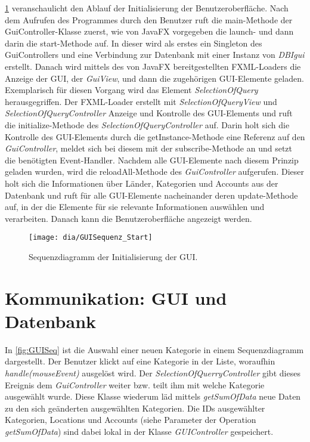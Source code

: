 \cref{fig:GUIStartSeq} veranschaulicht den Ablauf der Initialisierung der Benutzeroberfläche. Nach dem Aufrufen des Programmes durch den Benutzer ruft die main-Methode der GuiController-Klasse zuerst, wie von JavaFX vorgegeben die launch- und dann darin die start-Methode auf.
In dieser wird als erstes ein Singleton des GuiControllers und eine Verbindung zur Datenbank mit einer Instanz von \emph{DBIgui} erstellt. Danach wird mittels des von JavaFX bereitgestellten FXML-Loaders die Anzeige der GUI, der \emph{GuiView}, und dann die zugehörigen GUI-Elemente geladen.
Exemplarisch für diesen Vorgang wird das Element \emph{SelectionOfQuery} herausgegriffen.
Der FXML-Loader erstellt mit \emph{SelectionOfQueryView} und \emph{SelectionOfQueryController} Anzeige und Kontrolle des GUI-Elements und ruft die initialize-Methode des \emph{SelectionOfQueryController} auf.
Darin holt sich die Kontrolle des GUI-Elements durch die getInstance-Methode eine Referenz auf den \emph{GuiController}, meldet sich bei diesem mit der subscribe-Methode an und setzt die benötigten Event-Handler.
Nachdem alle GUI-Elemente nach diesem Prinzip geladen wurden, wird die reloadAll-Methode des \emph{GuiController} aufgerufen. Dieser holt sich die Informationen über Länder, Kategorien und Accounts aus der Datenbank und ruft für alle GUI-Elemente nacheinander deren update-Methode auf, in der die Elemente für sie relevante Informationen auswählen und verarbeiten.
Danach kann die Benutzeroberfläche angezeigt werden.

\begin{figure}[h!]
	\centering
	\texttt{[image: dia/GUISequenz\_Start]}
	\caption{Sequenzdiagramm der Initialisierung der GUI.}
	\label{fig:GUIStartSeq}
\end{figure}
\section{Kommunikation: GUI und Datenbank}
In \cref{fig:GUISeq} ist die Auswahl einer neuen Kategorie in einem Sequenzdiagramm dargestellt. Der Benutzer klickt auf eine Kategorie in der Liste, woraufhin \emph{handle(mouseEvent)} ausgelöst wird. Der \emph{SelectionOfQuerryController} gibt dieses Ereignis dem \emph{GuiController} weiter bzw.  teilt ihm mit welche Kategorie ausgewählt wurde. Diese Klasse wiederum läd mittels \emph{getSumOfData} neue Daten zu den sich geänderten ausgewählten Kategorien. Die IDs ausgewählter Kategorien, Locations und Accounts (siehe Parameter der Operation \emph{getSumOfData}) sind dabei lokal in der Klasse \emph{GUIController} gespeichert.

